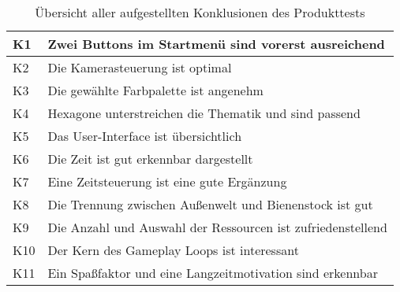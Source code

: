 \begin{table}[]
    \centering
    \caption{Übersicht aller aufgestellten Konklusionen des Produkttests}
    \label{table:conclusions}
    \begin{tabular}{|l|l|}
    \hline
    K1 & Zwei Buttons im Startmenü sind vorerst ausreichend    \\ \hline
    K2 & Die Kamerasteuerung ist optimal                       \\ \hline
    K3 & Die gewählte Farbpalette ist angenehm                 \\ \hline
    K4 & Hexagone unterstreichen die Thematik und sind passend \\ \hline
    K5 & Das User-Interface ist übersichtlich                  \\ \hline
    K6 & Die Zeit ist gut erkennbar dargestellt                 \\ \hline
    K7 & Eine Zeitsteuerung ist eine gute Ergänzung                  \\ \hline
    K8 & Die Trennung zwischen Außenwelt und Bienenstock ist gut                  \\ \hline
    K9 & Die Anzahl und Auswahl der Ressourcen ist zufriedenstellend                  \\ \hline
    K10 & Der Kern des Gameplay Loops ist interessant                  \\ \hline
    K11 & Ein Spaßfaktor und eine Langzeitmotivation sind erkennbar                  \\ \hline
    \end{tabular}
\end{table}
